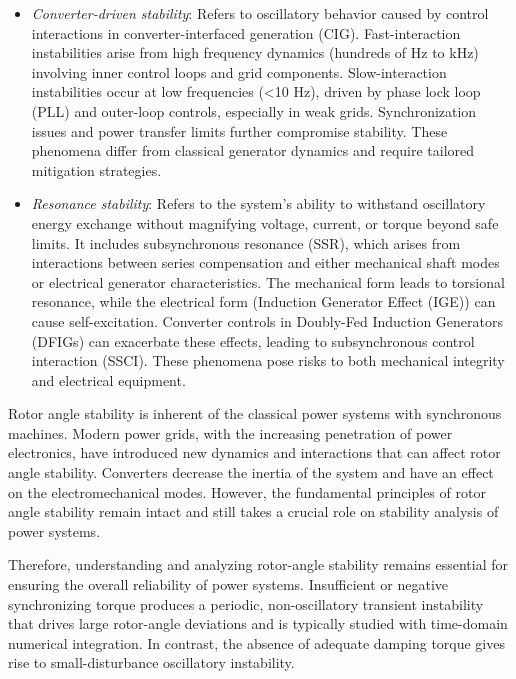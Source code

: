   
\begin{itemize}
    \item \textit{Converter-driven stability}: Refers to oscillatory behavior caused by control interactions in converter-interfaced generation (CIG). 
    Fast-interaction instabilities arise from high frequency dynamics (hundreds of Hz to kHz) involving inner control loops and grid components. 
    Slow-interaction instabilities occur at low frequencies (<10 Hz), driven by phase lock loop (PLL) and outer-loop controls, especially 
    in weak grids. Synchronization issues and power transfer limits further compromise stability. 
    These phenomena differ from classical generator dynamics and require tailored mitigation strategies.
    \item \textit{Resonance stability}: Refers to the system's ability to withstand oscillatory 
    energy exchange without magnifying voltage, current, or torque beyond safe limits. It includes subsynchronous 
    resonance (SSR), which arises from interactions between series compensation and either mechanical shaft modes or 
    electrical generator characteristics. The mechanical form leads to torsional resonance, while the electrical 
    form (Induction Generator Effect (IGE)) can cause self-excitation. Converter controls in Doubly-Fed Induction Generators (DFIGs) can exacerbate these 
    effects, leading to subsynchronous control interaction (SSCI). These phenomena pose risks to both mechanical integrity 
    and electrical equipment.
\end{itemize}


Rotor angle stability is inherent of the classical power systems with synchronous machines. Modern power grids, with the increasing penetration of 
power electronics, have introduced new dynamics and interactions that can affect rotor angle stability. Converters decrease the inertia of the system
and have an effect on the electromechanical modes. However, the fundamental principles of rotor angle stability remain intact and still takes
a crucial role on stability analysis of power systems.

Therefore, understanding and analyzing rotor-angle stability remains essential for ensuring the overall reliability of power systems. 
Insufficient or negative synchronizing torque produces a periodic, non-oscillatory transient instability that drives large rotor-angle deviations
and is typically studied with time-domain numerical integration. In contrast, the absence of adequate damping torque gives rise to small-disturbance
oscillatory instability.

